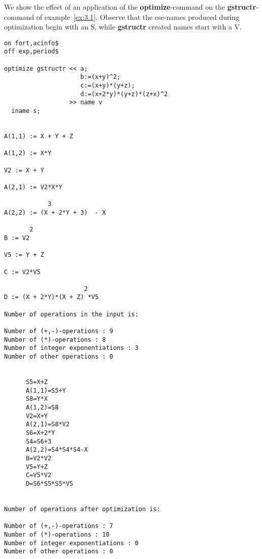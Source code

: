\example\label{ex:3.3}

We show the effect of an application of the {\bf optimize}-command on the
{\bf gstructr}-command of example~\ref{ex:3.1}.  Observe that the
cse-names produced during optimization begin with an S, while {\bf
gstructr} created names start with a V.
{\small
\begin{verbatim}
on fort,acinfo$
off exp,period$

optimize gstructr << a;
                     b:=(x+y)^2;
                     c:=(x+y)*(y+z);
                     d:=(x+2*y)*(y+z)*(z+x)^2
                  >> name v
  iname s;


A(1,1) := X + Y + Z

A(1,2) := X*Y

V2 := X + Y

A(2,1) := V2*X*Y

            3
A(2,2) := (X + 2*Y + 3)  - X

       2
B := V2

V5 := Y + Z

C := V2*V5

                      2
D := (X + 2*Y)*(X + Z) *V5

Number of operations in the input is:

Number of (+,-)-operations : 9
Number of (*)-operations : 8
Number of integer exponentiations : 3
Number of other operations : 0


      S5=X+Z
      A(1,1)=S5+Y
      S8=Y*X
      A(1,2)=S8
      V2=X+Y
      A(2,1)=S8*V2
      S6=X+2*Y
      S4=S6+3
      A(2,2)=S4*S4*S4-X
      B=V2*V2
      V5=Y+Z
      C=V5*V2
      D=S6*S5*S5*V5


Number of operations after optimization is:

Number of (+,-)-operations : 7
Number of (*)-operations : 10
Number of integer exponentiations : 0
Number of other operations : 0
\end{verbatim}
}

\example\label{ex:3.4}

